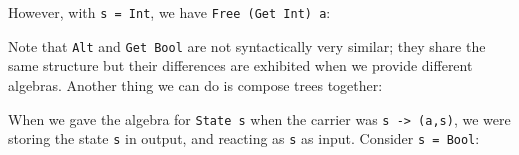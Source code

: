 \documentclass[a4paper,12pt]{article}
\theoremstyle{remark}
\begin{document}
\begin{figure}[H]
  \centering
\end{figure}

However, with \lstinline{s = Int}, we have \lstinline{Free (Get Int) a}:

\begin{figure}[H]
  \centering
\end{figure}

Note that \lstinline{Alt} and \lstinline{Get Bool} are not syntactically very
similar; they share the same structure but their differences are exhibited when
we provide different algebras. Another thing we can do is compose trees together:

\begin{figure}[H]
  \centering
\end{figure}

When we gave the algebra for \lstinline{State s} when the carrier was \lstinline{s -> (a,s)},
we were storing the state \lstinline{s} in output, and reacting as \lstinline{s}
as input. Consider \lstinline{s = Bool}:

\begin{figure}[H]
  \centering
\end{figure}
\end{document}
